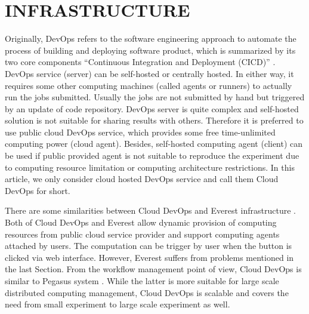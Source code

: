 \documentclass[10pt, conference, compsocconf]{IEEEtran}
\begin{document}
\section{INFRASTRUCTURE}
Originally, DevOps refers to the software engineering approach to automate the process of building and deploying software product, which is summarized by its two core components ``Continuous Integration and Deployment (CICD)'' \cite{bass2015devops}. 
DevOps service (server) can be self-hosted or centrally hosted. In either way, it requires some other computing machines (called agents or runners) to actually run the jobs submitted. Usually the jobs are not submitted by hand but triggered by an update of code repository. 
DevOps server is quite complex and self-hosted solution is not suitable for sharing results with others. Therefore it is preferred to use public cloud DevOps service, which provides some free time-unlimited computing power (cloud agent). Besides, self-hosted computing agent (client) can be used if public provided agent is not suitable to reproduce the experiment due to computing resource limitation or computing architecture restrictions. In this article, we only consider cloud hosted DevOps service and call them Cloud DevOps for short.

There are some similarities between Cloud DevOps and Everest infrastructure \cite{GavishD12} . Both of Cloud DevOps and Everest allow dynamic provision of computing resources from public cloud service provider and support computing agents attached by users. The computation can be trigger by user when the button is clicked via web interface.
However, Everest suffers from problems mentioned in the last Section. From the workflow management point of view, Cloud DevOps is similar to Pegasus system \cite{Pegasus}. While the latter is more suitable for large scale distributed computing management, Cloud DevOps is scalable and covers the need from small experiment to large scale experiment as well.
\end{document}
